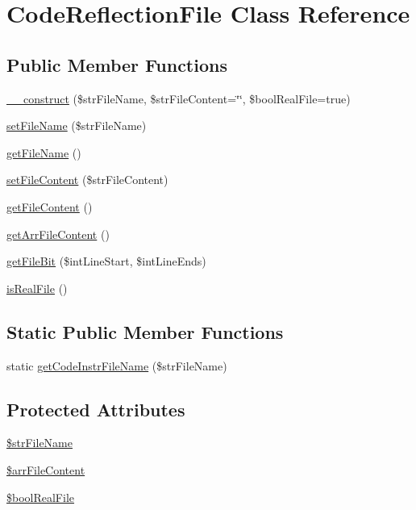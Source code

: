 \hypertarget{class_code_reflection_file}{
\section{CodeReflectionFile Class Reference}
\label{class_code_reflection_file}
}
\subsection*{Public Member Functions}
\begin{CompactItemize}
\item 
\hyperlink{class_code_reflection_file_85d5cd6390afa77ea3d3e67b8ebc762d}{\_\-\_\-construct} (\$strFileName, \$strFileContent=\char`\"{}\char`\"{}, \$boolRealFile=true)
\item 
\hyperlink{class_code_reflection_file_17c133a6bfc041953b6054ca6137c1e9}{setFileName} (\$strFileName)
\item 
\hyperlink{class_code_reflection_file_fd1320273fcd2bbeada22a40d33974ae}{getFileName} ()
\item 
\hyperlink{class_code_reflection_file_8bd4ac0c26519528027a9f2a2840ce77}{setFileContent} (\$strFileContent)
\item 
\hyperlink{class_code_reflection_file_f87150d5f818f1b92d30db63dfdf966a}{getFileContent} ()
\item 
\hyperlink{class_code_reflection_file_1c6e129f863511fd326ccf7a13d64c5a}{getArrFileContent} ()
\item 
\hyperlink{class_code_reflection_file_d5d0f670cbe1798cb50ad67ae37a9164}{getFileBit} (\$intLineStart, \$intLineEnds)
\item 
\hyperlink{class_code_reflection_file_995a74eebd5970a3bbe99c27a231600a}{isRealFile} ()
\end{CompactItemize}
\subsection*{Static Public Member Functions}
\begin{CompactItemize}
\item 
static \hyperlink{class_code_reflection_file_43822c529c08e8f126ab454b209fc31f}{getCodeInstrFileName} (\$strFileName)
\end{CompactItemize}
\subsection*{Protected Attributes}
\begin{CompactItemize}
\item 
\hyperlink{class_code_reflection_file_47606edf90d11273c6b4a4b319bc42c7}{\$strFileName}
\item 
\hyperlink{class_code_reflection_file_ce8c257c3c8d9148294d0b6f3493c2ba}{\$arrFileContent}
\item 
\hyperlink{class_code_reflection_file_9e00721eed14d115918aaba925005394}{\$boolRealFile}
\end{CompactItemize}
